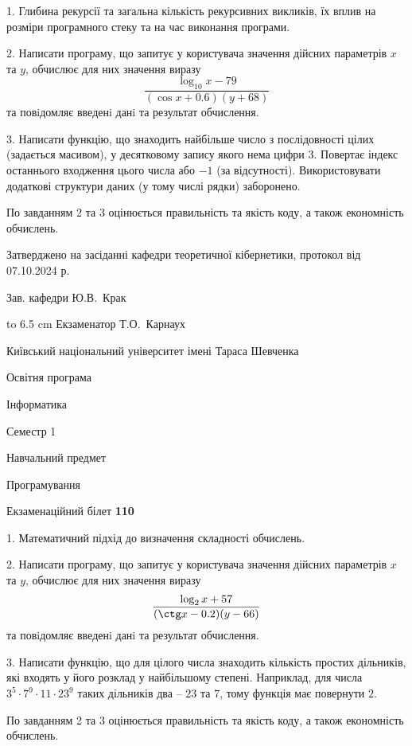 \documentclass[12pt, ukrainian]{article}
\begin{document}
{%
1. Глибина рекурсії та загальна кількість рекурсивних викликів, їх вплив на розміри програмного стеку та на час виконання програми.%
\par
2. Написати програму, що запитує у користувача значення дійсних параметрів $x$ та $y$, обчислює для них значення виразу 
$$\frac{\log_{10} x - 79}{(\cos x + 0.6) (y + 68)}$$ 
та повiдомляє введенi данi та результат обчислення.

\par
3. Написати функцію, що знаходить найбільше число з послідовності цілих (задається масивом), у десятковому запису якого нема цифри 3. Повертає індекс останнього входження цього числа або $-1$ (за відсутності). Використовувати додаткові структури даних (у тому числі рядки) заборонено.

По завданням 2 та 3 оцінюється правильність та якість коду, а також економність обчислень.

}
{\smallskip\smallskip \begin {scriptsize} Затверджено на засіданні кафедри теоретичної кібернетики, протокол   від   07.10.2024 р.\par\smallskip\smallskip\smallskip\smallskip
{\parbox {6.5 cm} {Зав. кафедри \dotfill Ю.В.~Крак}}\hspace {0.7cm} {\hbox to 6.5 cm { Екзаменатор \dotfill Т.О.~Карнаух}} \end{scriptsize}}
\vspace{0.9cm}
{{\begin {scriptsize}\par
{ \center  Київський національний університет імені Тараса Шевченка \par}
{\parbox {5 cm}{Освітня програма \hfill}{\parbox {7 cm}{Інформатика\hfill}}\parbox {6 cm}{\hfill Семестр 1}}\par
{\parbox {5 cm} {Навчальний предмет \hfill}\parbox {7 cm}{Програмування \hfill}\parbox {6cm}{\hfill}\par}\vspace{-15pt} \end{scriptsize}}{\center Екзаменаційний білет \No \textbf { 110 }\par}}
{%
1. Математичний підхід до визначення складності обчислень.%
\par
2. Написати програму, що запитує у користувача значення дійсних параметрів $x$ та $y$, обчислює для них значення виразу 
$$\frac{\log_{2} x + 57}{(\ctg x - 0.2) (y - 66)}$$ 
та повiдомляє введенi данi та результат обчислення.

\par
3. Написати функцію, що для цілого числа знаходить кількість простих дільників, які входять у його розклад у найбільшому степені. Наприклад, для числа $3^5{\cdot}7^9{\cdot}11{\cdot}23^{9}$ таких дільників два – $23$ та $7$, тому функція має повернути $2$.

По завданням 2 та 3 оцінюється правильність та якість коду, а також економність обчислень.

}
\end{document}
